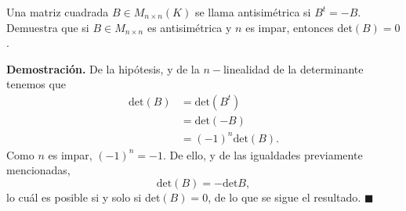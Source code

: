 \documentclass[11pt]{scrartcl}
\begin{document}
\newpage
\begin{mdframed}[style=mdpurplebox, frametitle={Ejercicio 4, Tarea 01, Álgebra Lineal II}]
    Una matriz cuadrada $B\in M_{n\times n}(K)$ se llama antisimétrica si $B^t=-B$. Demuestra que si $B\in M_{n\times n}$
    es antisimétrica y $n$ es impar, entonces det$(B)=0$.
\end{mdframed}
\textbf{Demostración.}
De la hipótesis, y de la $n-$linealidad de la determinante tenemos que
\begin{align*}
    \text{det}(B) &= \text{det}(B^t) \\
    &= \text{det}(-B) \\
    &= (-1)^n\text{det}(B).
\end{align*}
Como $n$ es impar, $(-1)^n=-1$. De ello, y de las igualdades previamente mencionadas,
\[
\text{det}(B)=-\text{det}B,
\]
lo cuál es posible si y solo si det$(B)=0$, de lo que se sigue el resultado. \hfill $\blacksquare$
\end{document}
